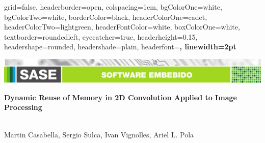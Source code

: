 \documentclass[a1paper,portrait,fontscale=0.43]{baposter}
\begin{document}
\begin{poster}
{
grid=false,
headerborder=open, %
colspacing=1em, %
bgColorOne=white, %
bgColorTwo=white, %
borderColor=black, %
headerColorOne=cadet, %
headerColorTwo=lightgreen, %
headerFontColor=white, %
boxColorOne=white, %
textborder=roundedleft, %
eyecatcher=true, %
headerheight=0.15\textheight, %
headershape=rounded, %
headershade=plain,
headerfont=\Large\bf\textsf, %
linewidth=2pt %
}
{}
%
%
{  
  {\includegraphics[trim=1.7cm 0 0 5cm, width=247mm]{software-embebido}\vspace{0.2em}}%


  \huge\bf\textsf %
  {Dynamic Reuse of Memory in 2D Convolution Applied to Image Processing}}
{\sf\vspace{0.5em}\\
    Martin Casabella,
    Sergio Sulca,
    Ivan Vignolles,
    Ariel L. Pola
    \small{

}}
\end{poster}
\end{document}
